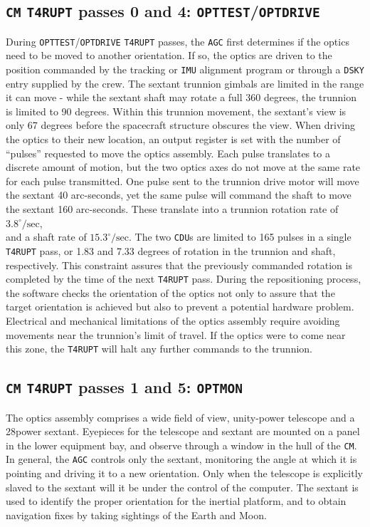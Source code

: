 \documentclass[refcap, oxford]{ahsan}
\begin{document}
\subsection{\texttt{CM} \texttt{T4RUPT} passes 0 and 4: \texttt{OPTTEST}/\texttt{OPTDRIVE}}
During \texttt{OPTTEST}/\texttt{OPTDRIVE} \texttt{T4RUPT} passes, the \texttt{AGC} first determines if the optics need to be moved to another orientation. If so, the optics are driven to the position commanded by the tracking or \texttt{IMU} alignment program or through a \texttt{DSKY} entry supplied by the crew. The sextant trunnion gimbals are limited in the range it can move - while the sextant shaft may rotate a full 360 degrees, the trunnion is limited to 90 degrees. Within this trunnion movement, the sextant's view is only 67 degrees before the spacecraft structure obscures the view. When driving the optics to their new location, an output register is set with the number of ``pulses'' requested to move the optics assembly. Each pulse translates to a discrete amount of motion, but the two optics axes do not move at the same rate for each pulse transmitted. One pulse sent to the trunnion drive motor will move the sextant 40 arc-seconds, yet the same pulse will command the shaft to move the sextant 160 arc-seconds. These translate into a trunnion rotation rate of $3.8^{\circ} / \mathrm{sec}$,\\
and a shaft rate of $15.3^{\circ} / \mathrm{sec}$. The two \texttt{CDU}s are limited to 165 pulses in a single \texttt{T4RUPT} pass, or 1.83 and 7.33 degrees of rotation in the trunnion and shaft, respectively. This constraint assures that the previously commanded rotation is completed by the time of the next \texttt{T4RUPT} pass. During the repositioning process, the software checks the orientation of the optics not only to assure that the target orientation is achieved but also to prevent a potential hardware problem. Electrical and mechanical limitations of the optics assembly require avoiding movements near the trunnion's limit of travel. If the optics were to come near this zone, the \texttt{T4RUPT} will halt any further commands to the trunnion.


\subsection{\texttt{CM} \texttt{T4RUPT} passes 1 and 5: \texttt{OPTMON}}
The optics assembly comprises a wide field of view, unity-power telescope and a 28power sextant. Eyepieces for the telescope and sextant are mounted on a panel in the lower equipment bay, and observe through a window in the hull of the \texttt{CM}. In general, the \texttt{AGC} controls only the sextant, monitoring the angle at which it is pointing and driving it to a new orientation. Only when the telescope is explicitly slaved to the sextant will it be under the control of the computer. The sextant is used to identify the proper orientation for the inertial platform, and to obtain navigation fixes by taking sightings of the Earth and Moon.
\end{document}
